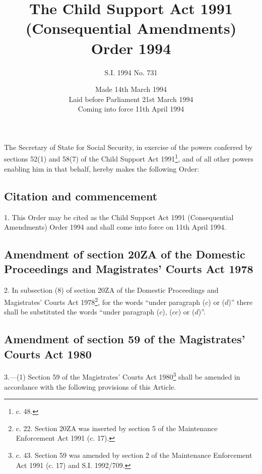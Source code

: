 \documentclass[a4paper]{article}
\title{The Child Support Act 1991 (Consequential Amendments) Order 1994}
\author{S.I. 1994 No. 731}
\date{Made 14th March 1994\\Laid before Parliament 21st March 1994\\Coming into force 11th April 1994}
\begin{document}
\maketitle

\noindent
The Secretary of State for Social Security, in exercise of the powers conferred by sections 52(1) and 58(7) of the Child Support Act 1991\footnote{ c. 48.}, and of all other powers enabling him in that behalf, hereby makes the following Order:


{\sloppy

\tableofcontents

}

\setcounter{secnumdepth}{-2}

\subsection[1. Citation and commencement]{Citation and commencement}

1.  This Order may be cited as the Child Support Act 1991 (Consequential Amendments) Order 1994 and shall come into force on 11th April 1994.

\subsection[2. Amendment of section 20ZA of the Domestic Proceedings and Magistrates' Courts Act 1978]{Amendment of section 20ZA of the Domestic Proceedings and Magistrates' Courts Act 1978}

2.  In subsection (8) of section 20ZA of the Domestic Proceedings and Magistrates' Courts Act 1978\footnote{ c. 22. Section 20ZA was inserted by section 5 of the Maintenance Enforcement Act 1991 (c. 17).}, for the words “under paragraph ($c$) or ($d$)” there shall be substituted the words “under paragraph ($c$), ($cc$) or ($d$)”.

\subsection[3. Amendment of section 59 of the Magistrates' Courts Act 1980]{Amendment of section 59 of the Magistrates' Courts Act 1980}

3.—(1) Section 59 of the Magistrates' Courts Act 1980\footnote{ c. 43. Section 59 was amended by section 2 of the Maintenance Enforcement Act 1991 (c. 17) and S.I. 1992/709.} shall be amended in accordance with the following provisions of this Article.
\end{document}

